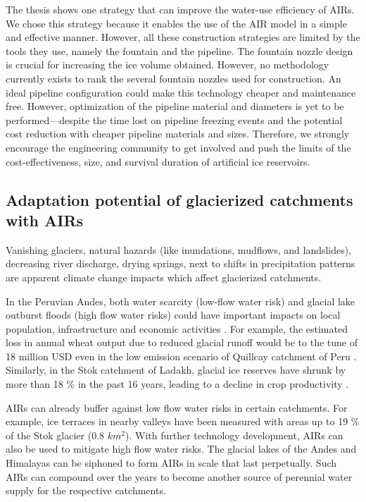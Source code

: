 The thesis shows one strategy that can improve the water-use efficiency of AIRs. We chose this strategy because
it enables the use of the AIR model in a simple and effective manner. However, all these construction strategies are
limited by the tools they use, namely the fountain and the pipeline. The fountain nozzle design is crucial for
increasing the ice volume obtained. However, no methodology currently exists to rank the several fountain
nozzles used for construction. An ideal pipeline configuration could make this technology cheaper and
maintenance free. However, optimization of the pipeline material and diameters is yet to be performed---despite
the time lost on pipeline freezing events and the potential cost reduction with cheaper pipeline materials and
sizes. Therefore, we strongly encourage the engineering community to get involved and push the limits of the
cost-effectiveness, size, and survival duration of artificial ice reservoirs.

\subsection{Adaptation potential of glacierized catchments with AIRs}

Vanishing glaciers, natural hazards (like inundations, mudflows, and landslides), decreasing river discharge,
drying springs, next to shifts in precipitation patterns are apparent climate change impacts which affect
glacierized catchments.

In the Peruvian Andes, both water scarcity (low-flow water risk) and glacial lake outburst floods (high flow
water risks) could have important impacts on local population, infrastructure and economic activities
\citep{motschmannIntegratedAssessmentsWater2020}. For example, the estimated loss in annual wheat output due to
reduced glacial runoff would be to the tune of 18 million USD even in the low emission scenario of Quillcay catchment
of Peru \citep{motschmannLossesDamagesConnected2020}. Similarly, in the Stok catchment of Ladakh, glacial ice
reserves have shrunk by more than 18 \% in the past 16 years, leading to a decline in crop productivity
\citep{sohebSpatiotemporalQuantificationKey2022}.

AIRs can already buffer against low flow water risks in certain catchments. For example, ice
terraces in nearby valleys have been measured with areas up to 19 \% of the Stok glacier (0.8 $km^2$). With further technology
development, AIRs can also be used to mitigate high flow water risks. The glacial lakes of the Andes and
Himalayas can be siphoned to form AIRs in scale that last perpetually. Such AIRs can compound over the years to
become another source of perennial water supply for the respective catchments.

